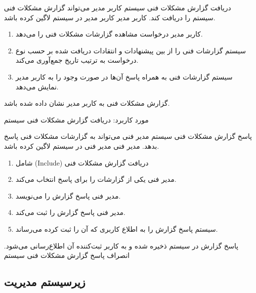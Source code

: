 {
	\usecase
	{دریافت گزارش مشکلات فنی سیستم}
	{}
	{کاربر مدیر می‌تواند گزارش مشکلات فنی سیستم را دریافت کند.}
	{کاربر مدیر}
	{}
	{کاربر مدیر در سیستم لاگین کرده باشد.}
	{
		\vspace*{-0.6cm}
		\begin{enumerate}
			\item 
کاربر مدیر درخواست مشاهده گزارشات مشکلات فنی را می‌دهد.
			\item
سیستم گزارشات فنی را از بین پیشنهادات و انتقادات دریافت شده بر حسب نوع درخواست به ترتیب تاریخ جمع‌آوری می‌کند.
			\item
سیستم گزارشات فنی به همراه پاسخ‌ آن‌ها در صورت وجود را به کاربر مدیر نمایش می‌دهد.
		\end{enumerate}
	}
	{
گزارش مشکلات فنی به کاربر مدیر نشان داده شده باشد.	
}
	{

	}
	{
	مورد کاربرد:	دریافت گزارش مشکلات فنی سیستم
	}

}


{
	\usecase
	{پاسخ گزارش مشکلات فنی سیستم}
	{}
	{مدیر فنی می‌تواند به گزارشات مشکلات فنی پاسخ بدهد.}
	{مدیر فنی}
	{}
	{مدیر فنی در سیستم لاگین کرده باشد.}
	{
		\vspace*{-0.6cm}
		\begin{enumerate}
			\item 
شامل (Include) دریافت گزارش مشکلات فنی
			\item
مدیر فنی یکی از گزارشات را برای پاسخ انتخاب می‌کند.
			\item
مدیر فنی پاسخ گزارش را می‌نویسد.
			\item
مدیر فنی پاسخ گزارش را ثبت می‌کند.

\item 
سیستم پاسخ گزارش را به اطلاع کاربری که آن را ثبت کرده می‌رساند.
		\end{enumerate}
	}
	{پاسخ گزارش در سیستم ذخیره شده و به کاربر ثبت‌کننده آن اطلاع‌رسانی می‌شود.}
	{
		انصراف
	}
	{
پاسخ گزارش مشکلات فنی سیستم
	}

}

\newpage
\subsection{زیرسیستم مدیریت}


